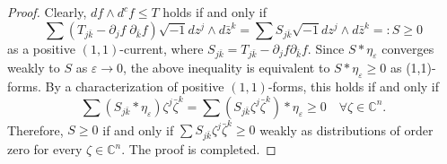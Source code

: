 \documentclass{amsart}
\renewcommand{\d}{\partial}
\newcommand{\ii}{\sqrt{-1}}
\newcommand{\veps}{\varepsilon}
\newcommand{\ze}{\zeta}
\newcommand{\bC}{\mathbb{C}}
\theoremstyle{definition}
\numberwithin{thm}{section}
\numberwithin{equation}{section}
\renewcommand{\[}{\begin{equation}}
\renewcommand{\]}{\end{equation}}
\newcommand{\wed}{\wedge}
\begin{document}
\begin{proof}  Clearly, $df\wed d^c f\leq T$ holds if and only if 
$$
	\sum (T_{j\bar k} - \d_j f \;\d_{\bar k} f)  \ii dz^j \wed d\bar z^k = \sum S_{j\bar k}  \ii dz^j \wed d\bar z^k =: S \geq 0
$$
as a positive $(1,1)$-current, where $S_{j\bar k} = T_{j\bar k} - \d_j f \d_{\bar k}f$. Since $S*\eta_\veps$ converges weakly to $S$ as $\veps \to 0$, the above inequality is equivalent to $S *\eta_\veps \geq 0$ as (1,1)-forms. By a characterization of positive $(1,1)$-forms, this holds if and only if 
$$
	\sum (S_{j\bar k} *\eta_\veps) \ze^j \bar\ze^k = \sum (S_{j\bar k} \ze^j \bar\ze^k)*\eta_\veps \geq 0 \quad \forall \ze\in \bC^n.
$$
Therefore, $S\geq 0$ if and only if 
$
	\sum S_{j\bar k} \ze^j \bar\ze^k \geq 0 
$
weakly as distributions of order zero for every $\ze \in \bC^n$. The proof is completed. 
\end{proof}
\end{document}

